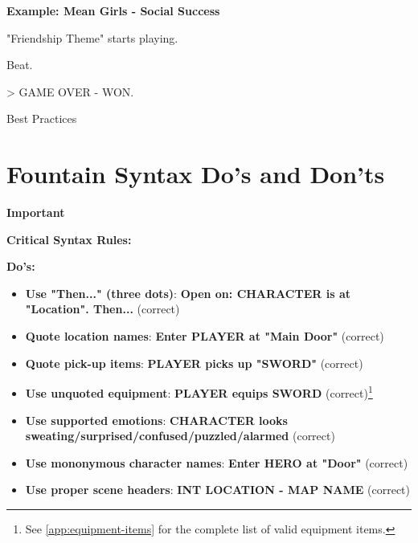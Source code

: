 \documentclass[11pt,letterpaper,oldstylefigures]{memoir}
\makeatletter
\newcommand{\stagedir}[1]{#1\par\vspace{1\baselineskip}}
\newenvironment{FountainExample}
  {\begingroup
  \ttfamily\small
   \setlength{\parindent}{0pt}
  \setlength{\parskip}{0.5em}
  \allowdisplaybreaks
  \setlength{\displaywidowpenalty}{0}
  \setlength{\widowpenalty}{0}
  \setlength{\clubpenalty}{0}
  \setlength{\interlinepenalty}{0}
}
  {\endgroup}
\newenvironment{Important}
{\begingroup
\small
\setlength{\parindent}{0pt}
\setlength{\parskip}{0.5em}
\allowdisplaybreaks
\setlength{\displaywidowpenalty}{0}
\setlength{\widowpenalty}{0}
\setlength{\clubpenalty}{0}
\setlength{\interlinepenalty}{0}
\begin{tcolorbox}[
    colback=yellow!5,
    colframe=yellow!75!black,
    boxrule=0.5pt,
    arc=2pt,
    left=0.5em,
    right=0.5em,
    top=0.25em,
    bottom=0.25em
]
\textbf{Important}
\end{tcolorbox}\par
}
{\endgroup}
\let\oldchapter\chapter
\def\chapter{%
  \@ifstar
    {\FountainScripting@starchapter}%
    {\@dblarg\FountainScripting@chapter}}
\def\FountainScripting@starchapter#1{\oldchapter*{#1}\chaptermark{#1}}
\def\FountainScripting@chapter[#1]#2{\oldchapter[#1]{#2}\chaptermark{#2}}
\newcommand{\fountain}[1]{\textbf{#1}}
\makeatother
\begin{document}
\textbf{Example: Mean Girls - Social Success}

\begin{FountainExample}
\stagedir{"Friendship Theme" starts playing.}
\stagedir{Beat.}
\stagedir{> GAME OVER - WON.}
\end{FountainExample}

\chapter{Best Practices}

\section{Fountain Syntax Do's and Don'ts}
\label{sec:fountain-syntax-dos-and-donts}

\begin{Important}
\textbf{Critical Syntax Rules:}
\end{Important}

\textbf{Do's:}
\begin{itemize}
\item \textbf{Use "Then..." (three dots)}: \fountain{Open on: CHARACTER is at "Location". Then...} (correct)
\item \textbf{Quote location names}: \fountain{Enter PLAYER at "Main Door"} (correct)
\item \textbf{Quote pick-up items}: \fountain{PLAYER picks up "SWORD"} (correct)
\item \textbf{Use unquoted equipment}: \fountain{PLAYER equips SWORD} (correct)\footnote{See \autoref{app:equipment-items} for the complete list of valid equipment items.}
\item \textbf{Use supported emotions}: \fountain{CHARACTER looks sweating/surprised/confused/puzzled/alarmed} (correct)
\item \textbf{Use mononymous character names}: \fountain{Enter HERO at "Door"} (correct)
\item \textbf{Use proper scene headers}: \fountain{INT LOCATION - MAP NAME} (correct)
\end{itemize}
\end{document}
